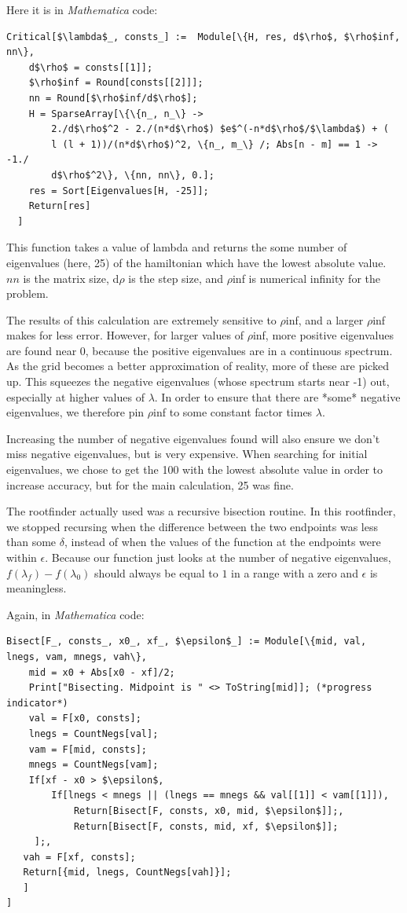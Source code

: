 \documentclass[12pt,twoside]{reedthesis}
\begin{document}
{Here it is in \emph{Mathematica} code:
\begin{Verbatim}[commandchars=\\\{\}, codes={\catcode`$=3}]
Critical[$\lambda$_, consts_] :=  Module[\{H, res, d$\rho$, $\rho$inf, nn\},
    d$\rho$ = consts[[1]];
    $\rho$inf = Round[consts[[2]]];
    nn = Round[$\rho$inf/d$\rho$];
    H = SparseArray[\{\{n_, n_\} -> 
        2./d$\rho$^2 - 2./(n*d$\rho$) $e$^(-n*d$\rho$/$\lambda$) + (
        l (l + 1))/(n*d$\rho$)^2, \{n_, m_\} /; Abs[n - m] == 1 -> -1./
        d$\rho$^2\}, \{nn, nn\}, 0.];
    res = Sort[Eigenvalues[H, -25]];
    Return[res]
  ]
\end{Verbatim}
This function takes a value of lambda and returns the some number of eigenvalues (here, 25)  of the hamiltonian which have the lowest absolute value. $nn$ is the matrix size, d$\rho$ is the step size, and $\rho$inf is numerical infinity for the problem.

The results of this calculation are extremely sensitive to $\rho$inf, and a larger $\rho$inf makes for less error. However, for larger values of $\rho$inf, more positive eigenvalues are found near 0, because the positive eigenvalues are in a continuous spectrum. As the grid becomes a better approximation of reality, more of these are picked up. This squeezes the negative eigenvalues (whose spectrum starts near -1) out, especially at higher values of $\lambda$. In order to ensure that there are *some* negative eigenvalues, we therefore pin $\rho$inf to some constant factor times $\lambda$. 

Increasing the number of negative eigenvalues found will also ensure we don't miss negative eigenvalues, but is very expensive. When searching for initial eigenvalues, we chose to get the 100 with the lowest absolute value in order to increase accuracy, but for the main calculation, 25 was fine.

The rootfinder actually used was a recursive bisection routine. In this rootfinder, we stopped recursing when the difference between the two endpoints was less than some $\delta$, instead of when the values of the function at the endpoints were within $\epsilon$. Because our function just looks at the number of negative eigenvalues, $f(\lambda_f) - f(\lambda_0)$ should always be equal to $1$ in a range with a zero and $\epsilon$ is meaningless. 

Again, in \emph{Mathematica} code:

\begin{Verbatim}[commandchars=\\\{\}, codes={\catcode`$=3}]
Bisect[F_, consts_, x0_, xf_, $\epsilon$_] := Module[\{mid, val, lnegs, vam, mnegs, vah\},
    mid = x0 + Abs[x0 - xf]/2;
    Print["Bisecting. Midpoint is " <> ToString[mid]]; (*progress indicator*)
    val = F[x0, consts];
    lnegs = CountNegs[val];
    vam = F[mid, consts];
    mnegs = CountNegs[vam];
    If[xf - x0 > $\epsilon$,
        If[lnegs < mnegs || (lnegs == mnegs && val[[1]] < vam[[1]]), 
            Return[Bisect[F, consts, x0, mid, $\epsilon$]];, 
            Return[Bisect[F, consts, mid, xf, $\epsilon$]]; 
     ];,
   vah = F[xf, consts];
   Return[{mid, lnegs, CountNegs[vah]}];
   ]
]
\end{Verbatim}

}
\end{document}
